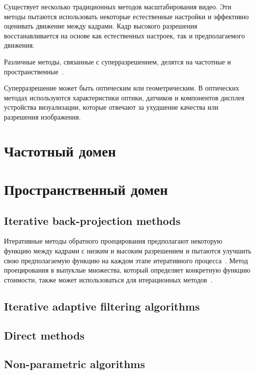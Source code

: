 \documentclass{bmstu}
\begin{document}
Существует несколько традиционных методов масштабирования видео. 
Эти методы пытаются использовать некоторые естественные настройки и эффективно оценивать движение между кадрами. 
Кадр высокого разрешения восстанавливается на основе как естественных настроек, так и предполагаемого движения.

Различные методы, связанные с суперразрешением, делятся на частотные и пространственные~\cite{Daithankar2021}.

Суперразрешение может быть оптическим или геометрическим. 
В оптических методах используются характеристики оптики, датчиков и компонентов дисплея устройства визуализации, которые отвечают за ухудшение качества или разрешения изображения. 

\section{Частотный домен}

\section{Пространственный домен}

\subsection{Iterative back-projection methods}

Итеративные методы обратного проецирования предполагают некоторую функцию между кадрами с низким и высоким разрешением и пытаются улучшить свою предполагаемую функцию на каждом этапе итеративного процесса~\cite{Cohen2000}. 
Метод проецирования в выпуклые множества, который определяет конкретную функцию стоимости, также может использоваться для итерационных методов~\cite{Katsaggelos1997}.

\subsection{Iterative adaptive filtering algorithms}

\subsection{Direct methods}

\subsection{Non-parametric algorithms}
\end{document}
